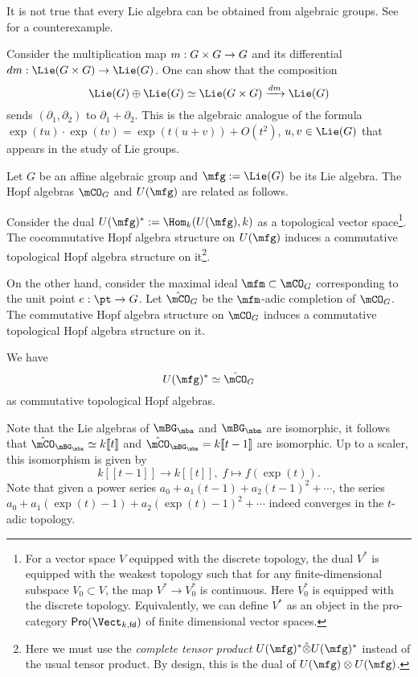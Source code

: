 \begin{warn}
	It is not true that every Lie algebra can be obtained from algebraic groups. See \cite[I, \S 5, Exercise 6]{Bou} for a counterexample.
\end{warn}

\begin{rem}
	Consider the multiplication map $m: G\mt G\to G$ and its differential $dm: \Lie(G\mt G)\to \Lie (G)$. One can show that the composition
	\[
		\Lie(G)\oplus \Lie(G) \simeq \Lie(G\mt G) \xrightarrow{dm} \Lie(G)
	\]
	sends $(\partial_1,\partial_2)$ to $\partial_1+\partial_2$.	This is the algebraic analogue of the formula $\exp(t u)\cdot \exp(t v) = \exp(t (u+v)) + O(t^2)$, $u,v\in \Lie(G)$ that appears in the study of Lie groups.

\end{rem}

\begin{rem}
	Let $G$ be an affine algebraic group and $\mfg:=\Lie(G)$ be its Lie algebra. The Hopf algebras $\mCO_G$ and $U(\mfg)$ are related as follows.

	Consider the dual $U(\mfg)^*:=\Hom_k(U(\mfg),k)$ as a topological vector space\footnote{For a vector space $V$ equipped with the discrete topology, the dual $V^*$ is equipped with the weakest topology such that for any finite-dimensional subspace $V_0\subset V$, the map $V^*\to V_0^*$ is continuous. Here $V_0^*$ is equipped with the discrete topology. Equivalently, we can define $V^*$ as an object in the pro-category $\mathsf{Pro}(\Vect_{k,\mathsf{fd}})$ of finite dimensional vector spaces.}. The cocommutative Hopf algebra structure on $U(\mfg)$ induces a commutative topological Hopf algebra structure on it\footnote{Here we must use the \emph{complete tensor product} $U(\mfg)^* \hat\otimes U(\mfg)^*$ instead of the usual tensor product. By design, this is the dual of $U(\mfg)\ot U(\mfg)$.
	}.

	On the other hand, consider the maximal ideal $\mfm\subset \mCO_G$ corresponding to the unit point $e:\pt \to G$. Let $\hat\mCO_G$ be the $\mfm$-adic completion of $\mCO_G$. The commutative Hopf algebra structure on $\mCO_G$ induces a commutative topological Hopf algebra structure on it.

	We have
	\[
		U(\mfg)^* \simeq \hat\mCO_G
	\]
	as commutative topological Hopf algebras.
\end{rem}

\begin{exam}
	Note that the Lie algebras of $\mBG_\mba$ and $\mBG_\mbm$ are isomorphic, it follows that $\hat\mCO_{\mBG_\mba} \simeq k[\![t]\!]$ and $\hat\mCO_{\mBG_\mbm}=k[\![t-1]\!]$ are isomorphic. Up to a scaler, this isomorphism is given by
	\[
		k[\![t-1]\!]\to k[\![t]\!],\; f\mapsto f(\exp(t)).
	\]
	Note that given a power series $a_0+a_1(t-1)+a_2(t-1)^2+\cdots$, the series $a_0+a_1(\exp(t)-1)+a_2(\exp(t)-1)^2+\cdots$ indeed converges in the $t$-adic topology.
	
\end{exam}

